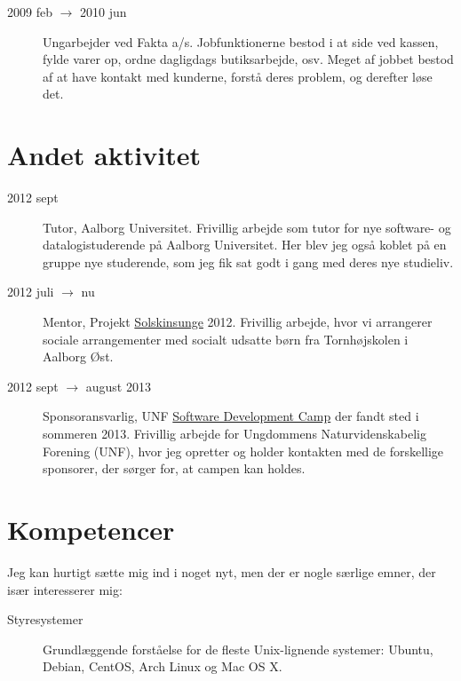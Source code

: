 \documentclass[margin,line,a4paper]{resume}
\begin{document}
\begin{resume}
\begin{description}
  \item[2009 feb $\rightarrow$ 2010 jun] Ungarbejder ved Fakta
    a/s. Jobfunktionerne bestod i at side ved kassen, fylde varer op,
    ordne dagligdags butiksarbejde, osv. Meget af jobbet bestod af at have
    kontakt med kunderne, forstå deres problem, og derefter løse det.
\end{description}

\section{\mysidestyle Andet aktivitet}\vspace{1mm}
\begin{description}
  \item[2012 sept] Tutor, Aalborg Universitet. Frivillig arbejde som tutor for
    nye software- og datalogistuderende på Aalborg Universitet. Her blev jeg også koblet på en
    gruppe nye studerende, som jeg fik sat godt i gang med deres nye studieliv.

  \item[2012 juli $\rightarrow$ nu] Mentor, Projekt
    \href{http://www.urk.dk/solskinsunge/}{Solskinsunge} 2012. Frivillig
    arbejde, hvor vi arrangerer sociale arrangementer med socialt udsatte
    børn fra Tornhøjskolen i Aalborg Øst.

  \item[2012 sept $\rightarrow$ august 2013] Sponsoransvarlig, UNF
    \href{http://software.unf.dk}{Software Development Camp} der
    fandt sted i sommeren 2013. Frivillig arbejde for Ungdommens
    Naturvidenskabelig Forening (UNF), hvor jeg opretter og holder
    kontakten med de forskellige sponsorer, der sørger for, at campen kan
    holdes.
\end{description}

\section{\mysidestyle Kompetencer} \vspace{1mm}
Jeg kan hurtigt sætte mig
ind i noget nyt, men der er nogle særlige emner, der især interesserer
mig:
\vspace{0.5cm}
\begin{description}

  \item[Styresystemer] Grundlæggende forståelse for de fleste
    Unix-lignende systemer: Ubuntu, Debian, CentOS, Arch Linux og Mac OS
    X.


\end{description}
\end{resume}
\end{document}
